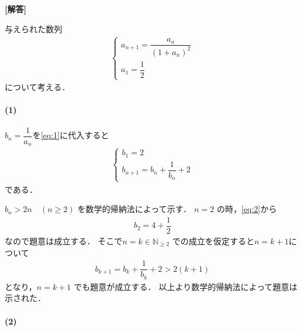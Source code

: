 \documentclass[../../main.tex]{subfiles}
\begin{document}
\begin{oframed}
  
\end{oframed}

{\bf [解答]}

与えられた数列
\begin{align}
  \begin{cases}
    a_{n+1}=\dfrac{a_n}{(1+a_n)^2} \\
    a_1 = \dfrac{1}{2}
  \end{cases} \label{eq:1}
\end{align}
について考える．

\paragraph{(1)}

$b_n=\dfrac{1}{a_n}$を\cref{eq:1}に代入すると
\begin{align}
  \begin{cases}
    b_1 = 2 \\
    b_{n+1} = b_n + \dfrac{1}{b_n} + 2
  \end{cases} \label{eq:2}
\end{align}
である．

$b_n > 2n \quad (n \ge 2)$ を数学的帰納法によって示す．
$n=2$ の時，\cref{eq:2}から
\begin{align}
  b_2 = 4 + \dfrac{1}{2}
\end{align}
なので題意は成立する．
そこで$n=k \in \mathbb{N}_{\ge 2}$ での成立を仮定すると$n=k+1$について
\begin{align}
  b_{k+1} = b_k + \dfrac{1}{b_k} + 2 > 2(k + 1)
\end{align}
となり，$n=k+1$ でも題意が成立する．
以上より数学的帰納法によって題意は示された．

\paragraph{(2)}
\end{document}
